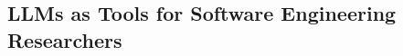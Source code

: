 



\subsection{LLMs as Tools for Software Engineering Researchers}
\label{sec:llms-as-tools-for-software-engineering-researchers}





